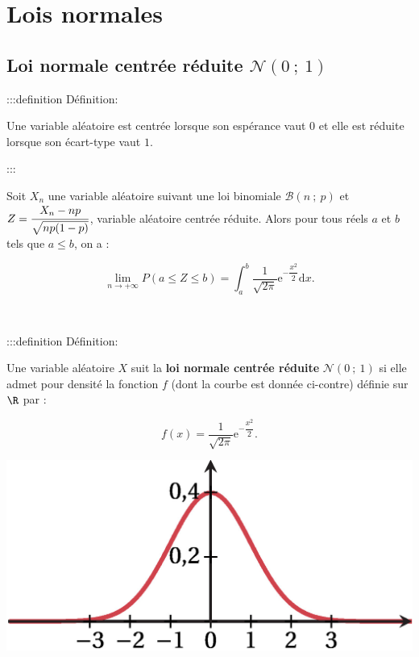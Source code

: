 \documentclass{cornouaille}
\begin{document}
\section{Lois normales}



\subsection{Loi normale centrée réduite $\mathcal{N}(0\ ;\ 1)$}





:::definition Définition: 


Une variable aléatoire est centrée lorsque son espérance vaut $0$ et elle est réduite lorsque son écart-type vaut $1$.


:::



\begin{theoreme}
Soit $X_n$ une variable aléatoire suivant une loi binomiale
$\mathcal{B}(n\ ;\ p)$ et $Z=\cfrac{X_n-np}{\sqrt{np(1-p)}}$,
\mbox{variable} aléatoire centrée réduite.  Alors pour tous réels
$a$ et $b$ tels que $a\leqslant b$, on a :

$$
\lim_{n\rightarrow +\infty}P(a\leqslant
Z\leqslant b)=\int_a^b \dfrac{1}{\sqrt{2\pi}}
\textrm{e}^{-\dfrac{x^2}{2}} \textrm{d} x.
$$

~~


\end{theoreme}






:::definition Définition: 




\begin{minipage}{0.6\linewidth}
Une variable aléatoire $X$ suit la \textbf{loi normale
centrée \mbox{réduite}}
$\mathcal{N}(0\ ;\ 1)$ si elle admet pour densité la fonction $f$
(dont la courbe est donnée ci-contre) définie sur $\R$ par :

$$
f(x)=\dfrac{1}{\sqrt{2\pi}}\textrm{e}^{-\dfrac{x^2}{2}}.
$$
\end{minipage}

\hfill

\begin{minipage}{0.4\linewidth}



\includegraphics{./TS-Variables-4}



\end{minipage}
\end{document}
